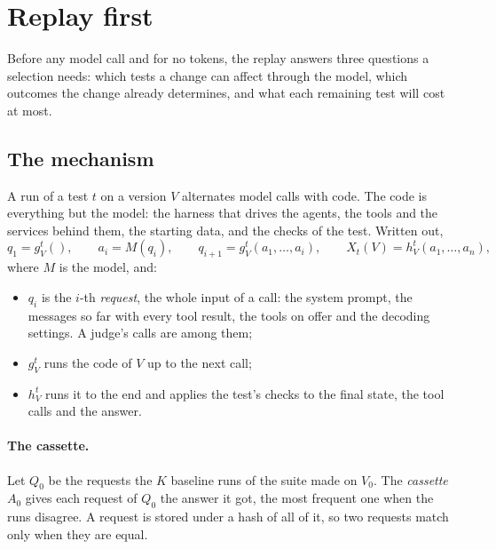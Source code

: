 \documentclass[11pt,a4paper]{article}
\begin{document}
\section{Replay first}
\label{sec:replay}

Before any model call and for no tokens, the replay answers three questions a selection needs: which tests a
change can affect through the model, which outcomes the change already determines, and what each remaining test
will cost at most.

\subsection{The mechanism}

A run of a test $t$ on a version $V$ alternates model calls with code. The code is everything but the model: the
harness that drives the agents, the tools and the services behind them, the starting data, and the checks of the
test. Written out,
\begin{equation}
  q_1 = g^t_V(), \qquad a_i = M(q_i), \qquad q_{i+1} = g^t_V(a_1, \dots, a_i), \qquad
  X_t(V) = h^t_V(a_1, \dots, a_n),
  \label{eq:run}
\end{equation}
where $M$ is the model, and:
\begin{itemize}
  \item $q_i$ is the $i$-th \emph{request}, the whole input of a call: the system prompt, the messages so far with
        every tool result, the tools on offer and the decoding settings. A judge's calls are among them;
  \item $g^t_V$ runs the code of $V$ up to the next call;
  \item $h^t_V$ runs it to the end and applies the test's checks to the final state, the tool calls and the
        answer.
\end{itemize}

\paragraph{The cassette.} Let $Q_0$ be the requests the $K$ baseline runs of the suite made on $V_0$. The
\emph{cassette} $A_0$ gives each request of $Q_0$ the answer it got, the most frequent one when the runs disagree.
A request is stored under a hash of all of it, so two requests match only when they are equal.
\end{document}

